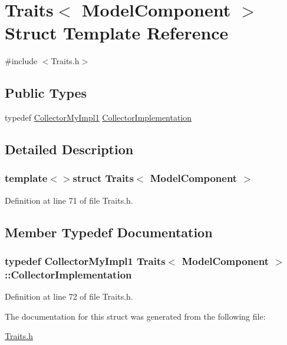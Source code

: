 \hypertarget{struct_traits_3_01_model_component_01_4}{\section{Traits$<$ Model\-Component $>$ Struct Template Reference}
\label{struct_traits_3_01_model_component_01_4}
}


{\ttfamily \#include $<$Traits.\-h$>$}

\subsection*{Public Types}
\begin{DoxyCompactItemize}
\item 
typedef \hyperlink{class_collector_my_impl1}{Collector\-My\-Impl1} \hyperlink{struct_traits_3_01_model_component_01_4_aea662c7138c7186aa5d60a6912d0010a}{Collector\-Implementation}
\end{DoxyCompactItemize}


\subsection{Detailed Description}
\subsubsection*{template$<$$>$struct Traits$<$ Model\-Component $>$}



Definition at line 71 of file Traits.\-h.



\subsection{Member Typedef Documentation}
\hypertarget{struct_traits_3_01_model_component_01_4_aea662c7138c7186aa5d60a6912d0010a}{
\subsubsection[{Collector\-Implementation}]{\setlength{\rightskip}{0pt plus 5cm}typedef {\bf Collector\-My\-Impl1} {\bf Traits}$<$ {\bf Model\-Component} $>$\-::{\bf Collector\-Implementation}}}\label{struct_traits_3_01_model_component_01_4_aea662c7138c7186aa5d60a6912d0010a}


Definition at line 72 of file Traits.\-h.



The documentation for this struct was generated from the following file\-:\begin{DoxyCompactItemize}
\item 
\hyperlink{_traits_8h}{Traits.\-h}\end{DoxyCompactItemize}
